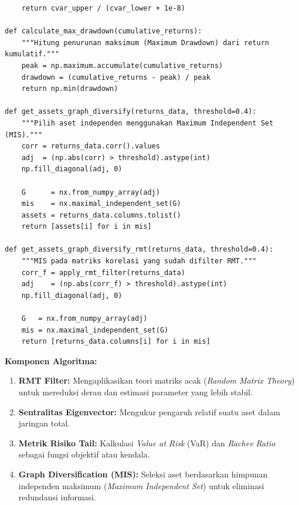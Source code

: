 \documentclass[12pt, a4paper]{article}
\begin{document}
\begin{lstlisting}
    return cvar_upper / (cvar_lower + 1e-8)

def calculate_max_drawdown(cumulative_returns):
    """Hitung penurunan maksimum (Maximum Drawdown) dari return kumulatif."""
    peak = np.maximum.accumulate(cumulative_returns)
    drawdown = (cumulative_returns - peak) / peak
    return np.min(drawdown)

def get_assets_graph_diversify(returns_data, threshold=0.4):
    """Pilih aset independen menggunakan Maximum Independent Set (MIS)."""
    corr = returns_data.corr().values
    adj  = (np.abs(corr) > threshold).astype(int)
    np.fill_diagonal(adj, 0)
    
    G      = nx.from_numpy_array(adj)
    mis    = nx.maximal_independent_set(G)
    assets = returns_data.columns.tolist()
    return [assets[i] for i in mis]

def get_assets_graph_diversify_rmt(returns_data, threshold=0.4):
    """MIS pada matriks korelasi yang sudah difilter RMT."""
    corr_f = apply_rmt_filter(returns_data)
    adj    = (np.abs(corr_f) > threshold).astype(int)
    np.fill_diagonal(adj, 0)
    
    G   = nx.from_numpy_array(adj)
    mis = nx.maximal_independent_set(G)
    return [returns_data.columns[i] for i in mis]
\end{lstlisting}
\textbf{Komponen Algoritma:}
\begin{enumerate}
    \item \textbf{RMT Filter:} Mengaplikasikan teori matriks acak (\textit{Random Matrix Theory}) untuk mereduksi derau dan estimasi parameter yang lebih stabil.
    \item \textbf{Sentralitas Eigenvector:} Mengukur pengaruh relatif suatu aset dalam jaringan total.
    \item \textbf{Metrik Risiko Tail:} Kalkulasi \textit{Value at Risk} (VaR) dan \textit{Rachev Ratio} sebagai fungsi objektif atau kendala.
    \item \textbf{Graph Diversification (MIS):} Seleksi aset berdasarkan himpunan independen maksimum (\textit{Maximum Independent Set}) untuk eliminasi redundansi informasi.
\end{enumerate}
\end{document}
